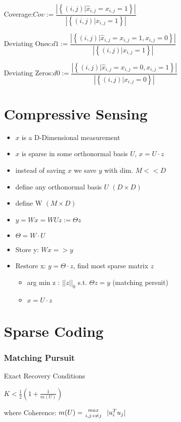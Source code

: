 \documentclass[11pt,twocolumn]{article}
\begin{document}
Coverage:$Cov:=\dfrac{|\left\lbrace(i,j)|\hat{x}_{i,j}=x_{i,j}=1\right\rbrace|}{|\left\lbrace(i,j)|x_{i,j}=1 \right\rbrace|}$

Deviating Ones:$d1:=\dfrac{|\left\lbrace(i,j)|\hat{x}_{i,j}=x_{i,j}=1,x_{i,j}=0\right\rbrace|}{|\left\lbrace(i,j)|x_{i,j}=1 \right\rbrace|}$

Deviating Zeros:$d0:=\dfrac{|\left\lbrace(i,j)|\hat{x}_{i,j}=x_{i,j}=0,x_{i,j}=1\right\rbrace|}{|\left\lbrace(i,j)|x_{i,j}=0 \right\rbrace|}$

\section{Compressive Sensing}

\begin{itemize}
\item $x$ is a D-Dimensional measurement
\item $x$ is sparse in some orthonormal basis $U$, $x = U \cdot z$
\item instead of saving $x$ we save $y$ with dim. $M<<D$
\item define any orthonormal basis $U$ $(D \times D)$
\item define W $(M \times D)$
\item $y = Wx = WUz := \Theta z$

\item $\Theta = W \cdot U$
\item Store y: $Wx => y$
\item Restore x: $y = \Theta \cdot z$, find most sparse matrix $z$
	\begin{itemize}
	\item arg min z :  $||z||_0$  s.t.  $\Theta z  = y$ (matching persuit)
	\item $x = U \cdot z$
  	\end{itemize}
\end{itemize}

\section{Sparse Coding}
\subsubsection{Matching Pursuit}

Exact Recovery Conditions

$K< \frac{1}{2} \left(1+\frac{1}{m(U)}\right)$

where Coherence:  $m(U)= {max  \atop i,j:i \neq j} ~~ |u_i^T u_j|$
\end{document}
